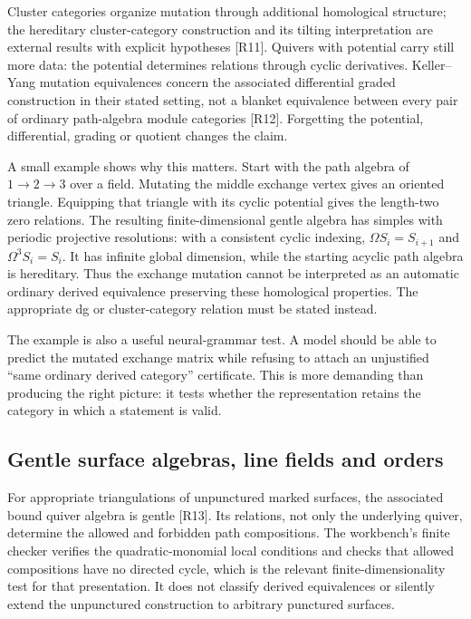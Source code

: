 Cluster categories organize mutation through additional homological structure; the hereditary cluster-category construction and its tilting interpretation are external results with explicit hypotheses [R11]. Quivers with potential carry still more data: the potential determines relations through cyclic derivatives. Keller--Yang mutation equivalences concern the associated differential graded construction in their stated setting, not a blanket equivalence between every pair of ordinary path-algebra module categories [R12]. Forgetting the potential, differential, grading or quotient changes the claim.

A small example shows why this matters. Start with the path algebra of $1\to2\to3$ over a field. Mutating the middle exchange vertex gives an oriented triangle. Equipping that triangle with its cyclic potential gives the length-two zero relations. The resulting finite-dimensional gentle algebra has simples with periodic projective resolutions: with a consistent cyclic indexing, $\Omega S_i=S_{i+1}$ and $\Omega^3S_i=S_i$. It has infinite global dimension, while the starting acyclic path algebra is hereditary. Thus the exchange mutation cannot be interpreted as an automatic ordinary derived equivalence preserving these homological properties. The appropriate dg or cluster-category relation must be stated instead.

The example is also a useful neural-grammar test. A model should be able to predict the mutated exchange matrix while refusing to attach an unjustified ``same ordinary derived category'' certificate. This is more demanding than producing the right picture: it tests whether the representation retains the category in which a statement is valid.

\subsection{Gentle surface algebras, line fields and orders}

For appropriate triangulations of unpunctured marked surfaces, the associated bound quiver algebra is gentle [R13]. Its relations, not only the underlying quiver, determine the allowed and forbidden path compositions. The workbench's finite checker verifies the quadratic-monomial local conditions and checks that allowed compositions have no directed cycle, which is the relevant finite-dimensionality test for that presentation. It does not classify derived equivalences or silently extend the unpunctured construction to arbitrary punctured surfaces.

